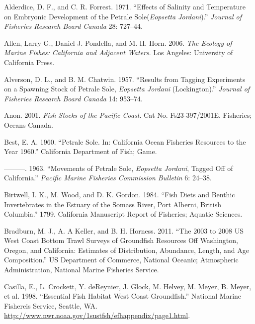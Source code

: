\documentclass[11pt,
  english,
  letterpaper,
]{article}
\newlength{\cslhangindent}
\newenvironment{cslreferences}%
  {\setlength{\parindent}{0pt}%
  \everypar{\setlength{\hangindent}{\cslhangindent}}\ignorespaces}%
  {\par}
\begin{document}
\hypertarget{refs}{}
\begin{cslreferences}
\leavevmode\hypertarget{ref-alderdice_effects_1971}{}%
Alderdice, D. F., and C. R. Forrest. 1971. ``Effects of Salinity and Temperature on Embryonic Development of the Petrale Sole(\emph{Eopsetta Jordani}).'' \emph{Journal of Fisheries Research Board Canada} 28: 727--44.

\leavevmode\hypertarget{ref-allen_ecology_2006}{}%
Allen, Larry G., Daniel J. Pondella, and M. H. Horn. 2006. \emph{The Ecology of Marine Fishes: California and Adjacent Waters}. Los Angeles: University of California Press.

\leavevmode\hypertarget{ref-alverson_results_1957}{}%
Alverson, D. L., and B. M. Chatwin. 1957. ``Results from Tagging Experiments on a Spawning Stock of Petrale Sole, \emph{Eopsetta Jordani} (Lockington).'' \emph{Journal of Fisheries Research Board Canada} 14: 953--74.

\leavevmode\hypertarget{ref-anon_fish_2001}{}%
Anon. 2001. \emph{Fish Stocks of the Pacific Coast}. Cat No. Fs23-397/2001E. Fisheries; Oceans Canada.

\leavevmode\hypertarget{ref-best_petrale_1960}{}%
Best, E. A. 1960. ``Petrale Sole. In: California Ocean Fisheries Resources to the Year 1960.'' California Department of Fish; Game.

\leavevmode\hypertarget{ref-best_e.a._movements_1963}{}%
---------. 1963. ``Movements of Petrale Sole, \emph{Eopsetta Jordani}, Tagged Off of California.'' \emph{Pacific Marine Fisheries Commission Bulletin} 6: 24--38.

\leavevmode\hypertarget{ref-birtwell_fish_1984}{}%
Birtwell, I. K., M. Wood, and D. K. Gordon. 1984. ``Fish Diets and Benthic Invertebrates in the Estuary of the Somass River, Port Alberni, British Columbia.'' 1799. California Manuscript Report of Fisheries; Aquatic Sciences.

\leavevmode\hypertarget{ref-bradburn_2003_2011}{}%
Bradburn, M. J., A. A Keller, and B. H. Horness. 2011. ``The 2003 to 2008 US West Coast Bottom Trawl Surveys of Groundfish Resources Off Washington, Oregon, and California: Estimates of Distribution, Abundance, Length, and Age Composition.'' US Department of Commerce, National Oceanic; Atmospheric Administration, National Marine Fisheries Service.

\leavevmode\hypertarget{ref-casilla_essential_1998}{}%
Casilla, E., L. Crockett, Y. deReynier, J. Glock, M. Helvey, M. Meyer, B. Meyer, et al. 1998. ``Essential Fish Habitat West Coast Groundfish.'' National Marine Fishereis Service, Seattle, WA. \url{http://www.nwr.noaa.gov/1sustfsh/efhappendix/page1.html}.


\end{cslreferences}
\end{document}
